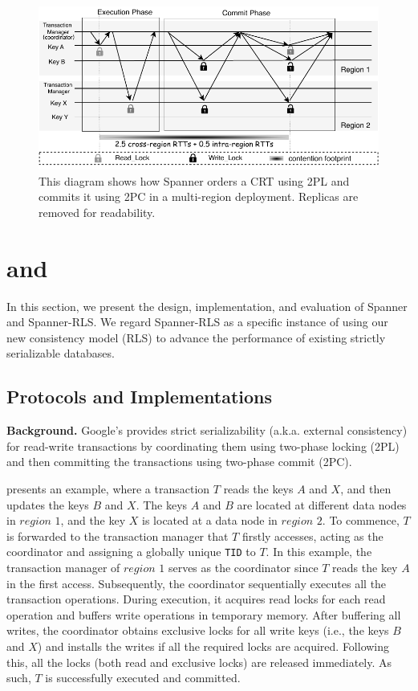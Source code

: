 
\begin{figure}[t]  
    \centering
    \includegraphics[width=1\columnwidth]{figures/spanner.pdf}
	\vspace{-5pt}
    \caption{This diagram shows how Spanner orders a CRT using 2PL and commits it using 2PC in a multi-region deployment. Replicas are removed for readability.} \label{fig:spanner}
\end{figure}

\section{\spanner and \spannerxx}\label{sec:spanner}
In this section, we present the design, implementation, and evaluation of Spanner and Spanner-RLS. We regard Spanner-RLS as a specific instance of using our new consistency model (RLS) to advance the performance of existing strictly serializable databases. 

\subsection{Protocols and Implementations}

\noindent\textbf{\spanner Background.} Google's \spanner provides strict serializability (a.k.a. external consistency) for read-write transactions by coordinating them using two-phase locking (2PL) and then committing the transactions using two-phase commit (2PC). 

 presents an example, where a transaction $T$ reads the keys $A$ and $X$, and then updates the keys $B$ and $X$. The keys $A$ and $B$ are located at different data nodes in $region$ $1$, and the key $X$ is located at a data node in $region$ $2$. To commence, $T$ is forwarded to the transaction manager that $T$ firstly accesses, acting as the coordinator and assigning a globally unique \texttt{TID} to $T$. In this example, the transaction manager of $region$ $1$ serves as the coordinator since $T$ reads the key $A$ in the first access. Subsequently, the coordinator sequentially executes all the transaction operations. During execution, it acquires read locks for each read operation and buffers write operations in temporary memory. After buffering all writes, the coordinator obtains exclusive locks for all write keys (i.e., the keys $B$ and $X$) and installs the writes if all the required locks are acquired. Following this, all the locks (both read and exclusive locks) are released immediately. As such, $T$ is successfully executed and committed.

